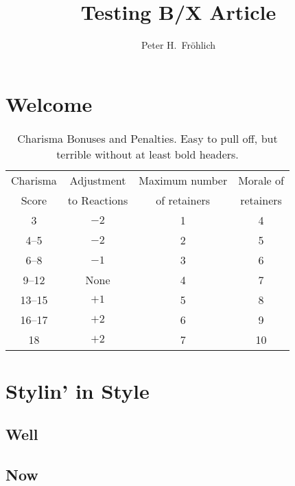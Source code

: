 \documentclass[11pt]{bxart}
\title{\textbf{Testing B/X Article}}
\author{Peter H.\ Fr\"ohlich}
\begin{document}
\maketitle
\tableofcontents

\section{Welcome}
\lipsum[1-6]

\begin{table}
\footnotesize
\centering
\begin{tabular}{cccc}
Charisma & Adjustment   & Maximum number & Morale of\\
Score    & to Reactions & of retainers   & retainers\\
\cmidrule(lr){1-1}\cmidrule(lr){2-2}\cmidrule(lr){3-3}\cmidrule(lr){4-4}
3      & \(-2\) & 1 & 4\\
4--5   & \(-2\) & 2 & 5\\
6--8   & \(-1\) & 3 & 6\\
9--12  & None   & 4 & 7\\
13--15 & \(+1\) & 5 & 8\\
16--17 & \(+2\) & 6 & 9\\
18     & \(+2\) & 7 & 10\\
\end{tabular}
\caption{Charisma Bonuses and Penalties. Easy to pull off, but terrible
without at least bold headers.}
\label{charisma}
\end{table}

\section{Stylin' in Style}
\subsection{Well}
\lipsum[11-15]
\subsection{Now}
\lipsum[16-20]
\end{document}
